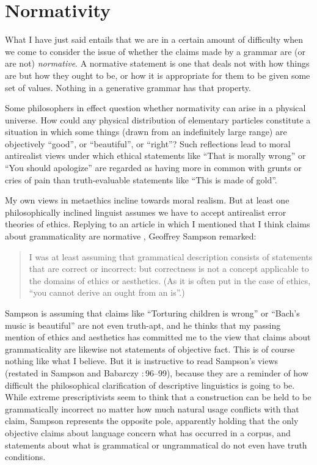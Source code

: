 \documentclass[output=paper]{langscibook}
\begin{document}
\section{Normativity}
\label{sec:pullum:normativity}

What I have just said entails that we are in a certain amount of difficulty when we come to consider the issue of whether the claims made by a grammar are (or are not) \emph{normative}.  A normative statement is one that deals not with how things are but how they ought to be, or how it is appropriate for them to be given some set of values. Nothing in a generative grammar has that property.

Some philosophers in effect question whether normativity can arise in a physical universe. How could any physical distribution of elementary particles constitute a situation in which some things (drawn from an indefinitely large range) are objectively ``good'', or ``beautiful'', or ``right''? Such reflections lead to moral antirealist views under which ethical statements like ``That is morally wrong'' or ``You should apologize'' are regarded as having more in common with grunts or cries of pain than truth-evaluable statements like ``This is made of gold''.

My own views in metaethics incline towards moral realism. But at least one philosophically inclined linguist assumes we have to accept antirealist error theories of ethics. Replying to an article in which I mentioned that I think claims about grammaticality are normative \citep{Pullum07}, Geoffrey Sampson remarked:

\begin{quote}
I was at least assuming that grammatical description consists of statements that are correct or incorrect: but correctness is not a concept applicable to the domains of ethics or aesthetics. (As it is often put in the case of ethics, ``you cannot derive an ought from an is''.)
\citep[112]{Sampson07reply}
\end{quote}

Sampson is assuming that claims like ``Torturing children is wrong'' or ``Bach's music is beautiful'' are not even truth-apt, and he thinks that my passing mention of ethics and aesthetics has committed me to the view that claims about grammaticality are likewise not statements of objective fact.  This is of course nothing like what I believe.  But it is instructive to read Sampson's views (restated in Sampson and Babarczy \citeyear{SampBaba14}:\,96--99), because they are a reminder of how difficult the philosophical clarification of descriptive linguistics is going to be. While extreme prescriptivists seem to think that a construction can be held to be grammatically incorrect no matter how much natural usage conflicts with that claim, Sampson represents the opposite pole, apparently holding that the only objective claims about language concern what has occurred in a corpus, and statements about what is grammatical or ungrammatical do not even have truth conditions.
\end{document}
